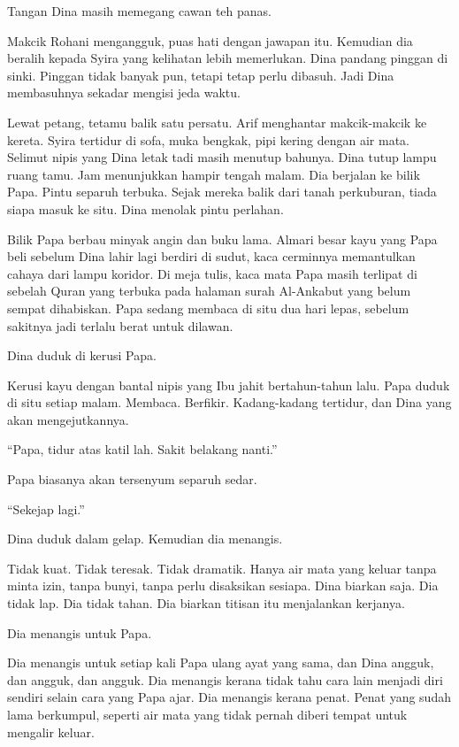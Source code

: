 \documentclass[
  11pt,
  a5paper,
  openany,
  oneside]{book}
\begin{document}
Tangan Dina masih memegang cawan teh panas.

Makcik Rohani mengangguk, puas hati dengan jawapan itu. Kemudian dia
beralih kepada Syira yang kelihatan lebih memerlukan. Dina pandang
pinggan di sinki. Pinggan tidak banyak pun, tetapi tetap perlu dibasuh.
Jadi Dina membasuhnya sekadar mengisi jeda waktu.

Lewat petang, tetamu balik satu persatu. Arif menghantar makcik-makcik
ke kereta. Syira tertidur di sofa, muka bengkak, pipi kering dengan air
mata. Selimut nipis yang Dina letak tadi masih menutup bahunya. Dina
tutup lampu ruang tamu. Jam menunjukkan hampir tengah malam. Dia
berjalan ke bilik Papa. Pintu separuh terbuka. Sejak mereka balik dari
tanah perkuburan, tiada siapa masuk ke situ. Dina menolak pintu
perlahan.

Bilik Papa berbau minyak angin dan buku lama. Almari besar kayu yang
Papa beli sebelum Dina lahir lagi berdiri di sudut, kaca cerminnya
memantulkan cahaya dari lampu koridor. Di meja tulis, kaca mata Papa
masih terlipat di sebelah Quran yang terbuka pada halaman surah
Al-Ankabut yang belum sempat dihabiskan. Papa sedang membaca di situ dua
hari lepas, sebelum sakitnya jadi terlalu berat untuk dilawan.

Dina duduk di kerusi Papa.

Kerusi kayu dengan bantal nipis yang Ibu jahit bertahun-tahun lalu. Papa
duduk di situ setiap malam. Membaca. Berfikir. Kadang-kadang tertidur,
dan Dina yang akan mengejutkannya.

``Papa, tidur atas katil lah. Sakit belakang nanti.''

Papa biasanya akan tersenyum separuh sedar.

``Sekejap lagi.''

Dina duduk dalam gelap. Kemudian dia menangis.

Tidak kuat. Tidak teresak. Tidak dramatik. Hanya air mata yang keluar
tanpa minta izin, tanpa bunyi, tanpa perlu disaksikan sesiapa. Dina
biarkan saja. Dia tidak lap. Dia tidak tahan. Dia biarkan titisan itu
menjalankan kerjanya.

Dia menangis untuk Papa.

Dia menangis untuk setiap kali Papa ulang ayat yang sama, dan Dina
angguk, dan angguk, dan angguk. Dia menangis kerana tidak tahu cara lain
menjadi diri sendiri selain cara yang Papa ajar. Dia menangis kerana
penat. Penat yang sudah lama berkumpul, seperti air mata yang tidak
pernah diberi tempat untuk mengalir keluar.
\end{document}
